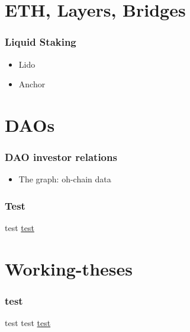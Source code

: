 \documentclass{../notes}
\begin{document}
\part{ETH, Layers, Bridges}
\section{Liquid Staking}
\begin{itemize}
    \item Lido
    \item Anchor
\end{itemize}

\part{DAOs}
\section{DAO investor relations}
\begin{itemize}
    \item The graph: oh-chain data
\end{itemize}

\section{Test}
test \href{https://www.overleaf.com/learn/latex/Hyperlinks}{test}

\part{Working-theses}
\section{test}
test test \href{run:./messari-2022-crypto-theses.pdf}{test}
\end{document}
